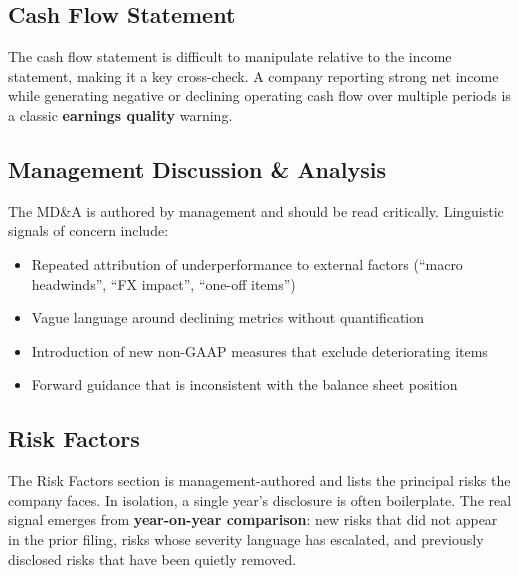 \documentclass[12pt,a4paper]{article}
\begin{document}
\subsection{Cash Flow Statement}

The cash flow statement is difficult to manipulate relative to the income statement,
making it a key cross-check. A company reporting strong net income while generating
negative or declining operating cash flow over multiple periods is a classic
\textbf{earnings quality} warning.

\subsection{Management Discussion \& Analysis}

The MD\&A is authored by management and should be read critically. Linguistic signals
of concern include:

\begin{itemize}[leftmargin=1.5cm]
  \item Repeated attribution of underperformance to external factors (``macro headwinds'',
    ``FX impact'', ``one-off items'')
  \item Vague language around declining metrics without quantification
  \item Introduction of new non-GAAP measures that exclude deteriorating items
  \item Forward guidance that is inconsistent with the balance sheet position
\end{itemize}

\subsection{Risk Factors}

The Risk Factors section is management-authored and lists the principal risks the
company faces. In isolation, a single year's disclosure is often boilerplate.
The real signal emerges from \textbf{year-on-year comparison}: new risks that did
not appear in the prior filing, risks whose severity language has escalated, and
previously disclosed risks that have been quietly removed.
\end{document}
